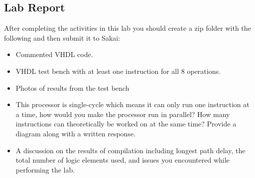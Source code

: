 \subsection{Lab Report}
After completing the activities in this lab you should create a zip folder with the following and then submit it to Sakai:

\begin{itemize}
	\item Commented VHDL code.
	\item VHDL test bench with at least one instruction for all 8 operations.
	\item Photos of results from the test bench
	\item This processor is single-cycle which means it can only run one instruction at a time, how would you make the processor run in parallel? How many instructions can theoretically be worked on at the same time? Provide a diagram along with a written response.
	\item A discussion on the results of compilation including longest path delay, the total number of logic elements used, and issues you encountered while performing the lab.
\end{itemize}
